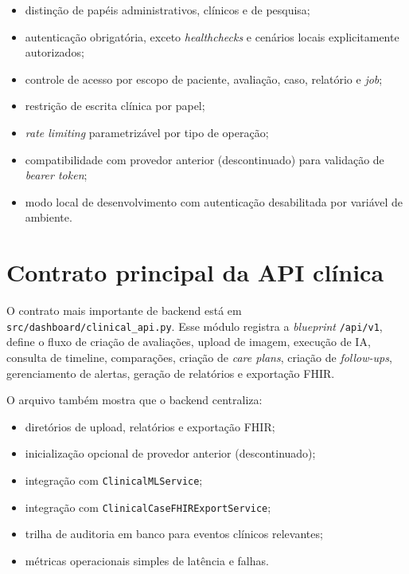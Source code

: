 \documentclass[
    12pt,
    openright,
    oneside,
    a4paper,
    chapter=TITLE,
    section=TITLE,
    brazil,
    sumario=tradicional,
    hidelinks
]{abntex2}
\begin{document}
\begin{itemize}
    \item distin\c{c}\~ao de pap\'eis administrativos, cl\'inicos e de pesquisa;
    \item autentica\c{c}\~ao obrigat\'oria, exceto \textit{healthchecks} e cen\'arios locais explicitamente autorizados;
    \item controle de acesso por escopo de paciente, avalia\c{c}\~ao, caso, relat\'orio e \textit{job};
    \item restri\c{c}\~ao de escrita cl\'inica por papel;
    \item \textit{rate limiting} parametriz\'avel por tipo de opera\c{c}\~ao;
    \item compatibilidade com provedor anterior (descontinuado) para valida\c{c}\~ao de \textit{bearer token};
    \item modo local de desenvolvimento com autentica\c{c}\~ao desabilitada por vari\'avel de ambiente.
\end{itemize}

\section{Contrato principal da API cl\'inica}

O contrato mais importante de backend est\'a em \texttt{src/dashboard/clinical\_api.py}. Esse m\'odulo registra a \textit{blueprint} \texttt{/api/v1}, define o fluxo de cria\c{c}\~ao de avalia\c{c}\~oes, upload de imagem, execu\c{c}\~ao de IA, consulta de timeline, compara\c{c}\~oes, cria\c{c}\~ao de \textit{care plans}, cria\c{c}\~ao de \textit{follow-ups}, gerenciamento de alertas, gera\c{c}\~ao de relat\'orios e exporta\c{c}\~ao FHIR.

O arquivo tamb\'em mostra que o backend centraliza:

\begin{itemize}
    \item diret\'orios de upload, relat\'orios e exporta\c{c}\~ao FHIR;
    \item inicializa\c{c}\~ao opcional de provedor anterior (descontinuado);
    \item integra\c{c}\~ao com \texttt{ClinicalMLService};
    \item integra\c{c}\~ao com \texttt{ClinicalCaseFHIRExportService};
    \item trilha de auditoria em banco para eventos cl\'inicos relevantes;
    \item m\'etricas operacionais simples de lat\^encia e falhas.
\end{itemize}
\end{document}
